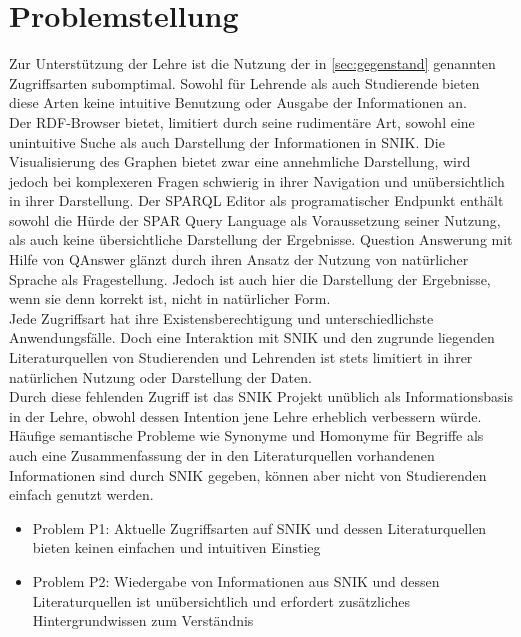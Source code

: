 \section{Problemstellung} \label{sec:problemstellung}
Zur Unterstützung der Lehre ist die Nutzung der in \ref{sec:gegenstand} genannten Zugriffsarten subomptimal. 
Sowohl für Lehrende als auch Studierende bieten diese Arten keine intuitive Benutzung oder Ausgabe der Informationen an.\\

Der RDF-Browser bietet, limitiert durch seine rudimentäre Art, sowohl eine unintuitive Suche als auch Darstellung der Informationen in SNIK.
Die Visualisierung des Graphen bietet zwar eine annehmliche Darstellung, wird jedoch bei komplexeren Fragen schwierig in ihrer Navigation und unübersichtlich in ihrer Darstellung. 
Der SPARQL Editor als programatischer Endpunkt enthält sowohl die Hürde der SPAR Query Language als Voraussetzung seiner Nutzung, als auch keine übersichtliche Darstellung der Ergebnisse. 
Question Answerung mit Hilfe von QAnswer glänzt durch ihren Ansatz der Nutzung von natürlicher Sprache als Fragestellung. Jedoch ist auch hier die Darstellung der Ergebnisse, wenn sie denn korrekt ist, nicht in natürlicher Form.\\

Jede Zugriffsart hat ihre Existensberechtigung und unterschiedlichste Anwendungsfälle. Doch eine Interaktion mit SNIK und den zugrunde liegenden Literaturquellen von Studierenden und Lehrenden ist stets limitiert in ihrer natürlichen Nutzung oder Darstellung der Daten.\\

Durch diese fehlenden Zugriff ist das SNIK Projekt unüblich als Informationsbasis in der Lehre, obwohl dessen Intention jene Lehre erheblich verbessern würde. 
Häufige semantische Probleme wie Synonyme und Homonyme für Begriffe als auch eine Zusammenfassung der in den Literaturquellen vorhandenen Informationen sind durch SNIK gegeben, können aber nicht von Studierenden einfach genutzt werden.\\

\begin{itemize}
  \item Problem P1: Aktuelle Zugriffsarten auf SNIK und dessen Literaturquellen bieten keinen einfachen und intuitiven Einstieg
  \item Problem P2: Wiedergabe von Informationen aus SNIK und dessen Literaturquellen ist unübersichtlich und erfordert zusätzliches Hintergrundwissen zum Verständnis
\end{itemize}

